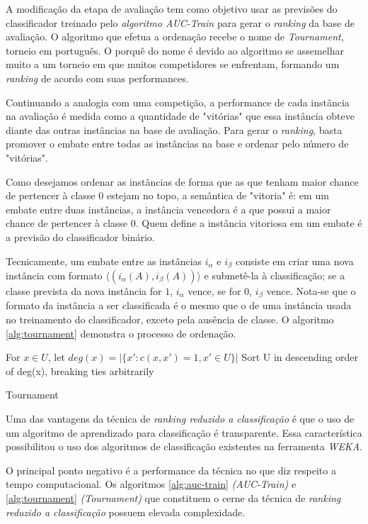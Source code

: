 A modificação da etapa de avaliação tem como objetivo usar as previsões do classificador treinado pelo \emph{algoritmo \emph{AUC-Train}} para gerar o \emph{ranking} da base de avaliação. O algoritmo que efetua a ordenação recebe o nome de \emph{Tournament}, torneio em português. O porquê do nome é devido ao algoritmo se assemelhar muito a um torneio em que muitos competidores se enfrentam, formando um \emph{ranking} de acordo com suas performances.

Continuando a analogia com uma competição, a performance de cada instância na avaliação é medida como a quantidade de "vitórias" que essa instância obteve diante das outras instâncias na base de avaliação. Para gerar o \emph{ranking}, basta promover o embate entre todas as instâncias na base e ordenar pelo número de "vitórias".

Como desejamos ordenar as instâncias de forma que as que tenham maior chance de pertencer à classe $0$ estejam no topo, a semântica de "vitoria" é: em um embate entre duas instâncias, a instância vencedora é a que possui a maior chance de pertencer à classe $0$. Quem define a instância vitoriosa em um embate é a previsão do classificador binário.

Tecnicamente, um embate entre as instâncias $i_\alpha$ e $i_\beta$ consiste em criar uma nova instância com formato $\langle (i_{\alpha}(A), i_{\beta}(A))\rangle$ e submetê-la à classificação; se a classe prevista da nova instância for $1$, $i_{\alpha}$ vence, se for $0$, $i_{\beta}$ vence. Nota-se que o formato da instância a ser classificada é o mesmo que o de uma instância usada no treinamento do classificador, exceto pela ausência de classe. O algoritmo \ref{alg:tournament} demonstra o processo de ordenação.

\begin{algorithm}[h!]
    For $x \in U$, let $deg(x) = |\{x':c(x, x') = 1, x' \in U\}|$\;
    Sort U in descending order of deg(x), breaking ties arbitrarily
    
    \caption{Tournament}
    \label{alg:tournament}
\end{algorithm}

Uma das vantagens da técnica de \emph{ranking reduzido a classificação} é que o uso de um algoritmo de aprendizado para classificação é transparente. Essa característica possibilitou o uso dos algoritmos de classificação existentes na ferramenta \emph{WEKA}.

O principal ponto negativo é a performance da técnica no que diz respeito a tempo computacional. Os algoritmos \ref{alg:auc-train} \emph{(AUC-Train)} e \ref{alg:tournament} \emph{(Tournament)} que constituem o cerne da técnica de \emph{ranking reduzido a classificação} possuem elevada complexidade.

